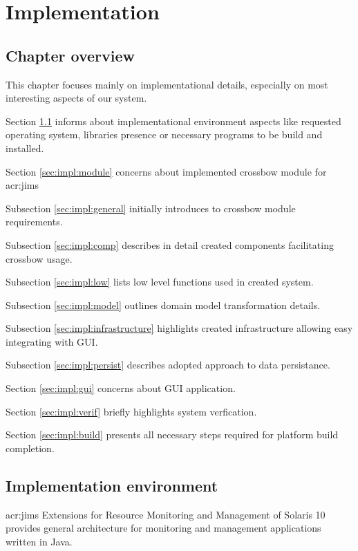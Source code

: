 \documentclass[11pt]{book}
\begin{document}
  \chapter{Implementation}
    
    \section*{Chapter overview}
	
      This chapter focuses mainly on implementational details, especially on most interesting aspects of our system.
		
      Section \ref{sec:impl:env} informs about implementational environment aspects like requested operating system,
      libraries presence or necessary programs to be build and installed. 
	  
	  Section \ref{sec:impl:module} concerns about implemented crossbow module for \gls{acr:jims}
	  
		\quad Subsection \ref{sec:impl:general} initially introduces to crossbow module requirements.

		\quad Subsection \ref{sec:impl:comp} describes in detail created components facilitating crossbow usage.
		
		\quad Subsection \ref{sec:impl:low} lists low level functions used in created system.

		\quad Subsection \ref{sec:impl:model} outlines domain model transformation details.
		
		\quad Subsection \ref{sec:impl:infrastructure} highlights created infrastructure allowing easy integrating with GUI.
		
		\quad Subsection \ref{sec:impl:persist} describes adopted approach to data persistance.
		
	  
	  Section \ref{sec:impl:gui} concerns about GUI application.
	  
	  Section \ref{sec:impl:verif} briefly highlights system verfication.
	
	  Section \ref{sec:impl:build} presents all necessary steps required for platform build completion.
	  
		


    \section{Implementation environment}
    \label{sec:impl:env}

      \gls{acr:jims} Extensions for Resource Monitoring and Management of Solaris 10 provides general architecture for
      monitoring and management applications written in Java. 
\end{document}
